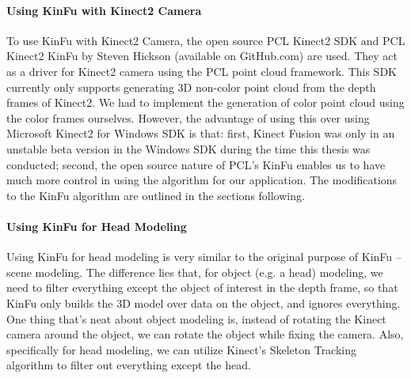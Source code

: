 \paragraph{Using KinFu with Kinect2 Camera}
To use KinFu with Kinect2 Camera, the open source PCL Kinect2 SDK and PCL Kinect2 KinFu by Steven Hickson (available on GitHub.com) are used.  They act as a driver for Kinect2 camera using the PCL point cloud framework.  This SDK currently only supports generating 3D non-color point cloud from the depth frames of Kinect2.  We had to implement the generation of color point cloud using the color frames ourselves.  However, the advantage of using this over using Microsoft Kinect2 for Windows SDK is that: first, Kinect Fusion was only in an unstable beta version in the Windows SDK during the time this thesis was conducted; second, the open source nature of PCL's KinFu enables us to have much more control in using the algorithm for our application.  The modifications to the KinFu algorithm are outlined in the sections following.


\paragraph{Using KinFu for Head Modeling}
Using KinFu for head modeling is very similar to the original purpose of KinFu -- scene modeling.  The difference lies that, for object (e.g. a head) modeling, we need to filter everything except the object of interest in the depth frame, so that KinFu only builds the 3D model over data on the object, and ignores everything.  One thing that's neat about object modeling is, instead of rotating the Kinect camera around the object, we can rotate the object while fixing the camera.  Also, specifically for head modeling, we can utilize Kinect's Skeleton Tracking algorithm to filter out everything except the head.

